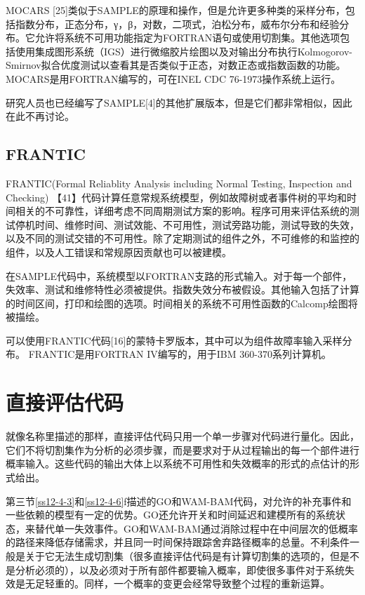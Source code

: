 \documentclass[cn,11pt,chinese]{elegantbook}
\begin{document}
{MOCARS [25]类似于SAMPLE的原理和操作，但是允许更多种类的采样分布，包括指数分布，正态分布，γ，β，对数，二项式，泊松分布，威布尔分布和经验分布。它允许将系统不可用功能指定为FORTRAN语句或使用切割集。其他选项包括使用集成图形系统（IGS）进行微缩胶片绘图以及对输出分布执行Kolmogorov-Smirnov拟合优度测试以查看其是否类似于正态，对数正态或指数函数的功能。MOCARS是用FORTRAN编写的，可在INEL CDC 76-1973操作系统上运行。

研究人员也已经编写了SAMPLE[4]的其他扩展版本，但是它们都非常相似，因此在此不再讨论。

\subsection{FRANTIC}\label{ss12-3-3}
FRANTIC(Formal Reliablity Analysis including Normal Testing, Inspection and Checking) 【41】代码计算任意常规系统模型，例如故障树或者事件树的平均和时间相关的不可靠性，详细考虑不同周期测试方案的影响。程序可用来评估系统的测试停机时间、维修时间、测试效能、不可用性，测试旁路功能，测试导致的失效，以及不同的测试交错的不可用性。除了定期测试的组件之外，不可维修的和监控的组件，以及人工错误和常规原因贡献也可以被建模。

在SAMPLE代码中，系统模型以FORTRAN支路的形式输入。对于每一个部件，失效率、测试和维修特性必须被提供。指数失效分布被假设。其他输入包括了计算的时间区间，打印和绘图的选项。时间相关的系统不可用性函数的Calcomp绘图将被描绘。

可以使用FRANTIC代码[16]的蒙特卡罗版本，其中可以为组件故障率输入采样分布。 FRANTIC是用FORTRAN IV编写的，用于IBM 360-370系列计算机。

\section{直接评估代码}

就像名称里描述的那样，直接评估代码只用一个单一步骤对代码进行量化。因此，它们不将切割集作为分析的必须步骤，而是要求对于从过程输出的每一个部件进行概率输入。这些代码的输出大体上以系统不可用性和失效概率的形式的点估计的形式给出。

第三节\ref{ss12-4-3}和\ref{ss12-4-6}f描述的GO和WAM-BAM代码，对允许的补充事件和一些依赖的模型有一定的优势。GO还允许开关和时间延迟和建模所有的系统状态，来替代单一失效事件。GO和WAM-BAM通过消除过程中在中间层次的低概率的路径来降低存储需求，并且同一时间保持跟踪舍弃路径概率的总量。不利条件一般是关于它无法生成切割集（很多直接评估代码是有计算切割集的选项的，但是不是分析必须的），以及必须对于所有部件都要输入概率，即使很多事件对于系统失效是无足轻重的。同样，一个概率的变更会经常导致整个过程的重新运算。

}
\end{document}
